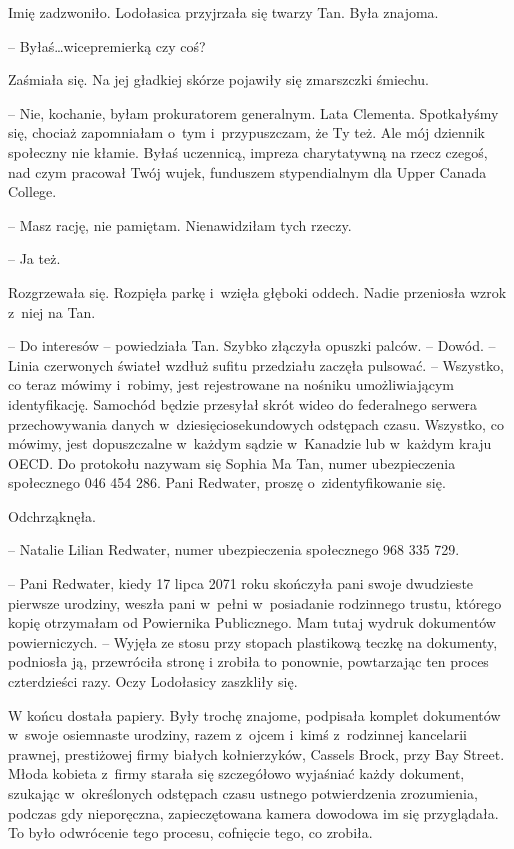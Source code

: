 \documentclass[oneside,polish,11pt,sfheadings]{mwbk}
\begin{document}
Imię zadzwoniło. Lodołasica przyjrzała się twarzy Tan. Była znajoma.

-- Byłaś\ldots  wicepremierką czy coś?

Zaśmiała się. Na jej gładkiej skórze pojawiły się zmarszczki śmiechu. 

-- Nie, kochanie, byłam prokuratorem generalnym. Lata Clementa. Spotkałyśmy
się, chociaż zapomniałam o~tym i~przypuszczam, że Ty też. Ale mój
dziennik społeczny nie kłamie. Byłaś uczennicą, impreza charytatywną na
rzecz czegoś, nad czym pracował Twój wujek, funduszem stypendialnym dla
Upper Canada College.

-- Masz rację, nie pamiętam. Nienawidziłam tych rzeczy.

-- Ja też.

Rozgrzewała się. Rozpięła parkę i~wzięła głęboki oddech. Nadie
przeniosła wzrok z~niej na Tan.

-- Do interesów -- powiedziała Tan. Szybko złączyła opuszki palców. -- Dowód. -- Linia czerwonych świateł wzdłuż sufitu przedziału zaczęła
pulsować. -- Wszystko, co teraz mówimy i~robimy, jest rejestrowane na
nośniku umożliwiającym identyfikację. Samochód będzie przesyłał skrót
wideo do federalnego serwera przechowywania danych w~dziesięciosekundowych odstępach czasu. Wszystko, co mówimy, jest
dopuszczalne w~każdym sądzie w~Kanadzie lub w~każdym kraju OECD. Do
protokołu nazywam się Sophia Ma Tan, numer ubezpieczenia społecznego 046
454 286. Pani Redwater, proszę o~zidentyfikowanie się.

Odchrząknęła. 

-- Natalie Lilian Redwater, numer ubezpieczenia społecznego
968 335 729.

-- Pani Redwater, kiedy 17 lipca 2071 roku skończyła pani swoje
dwudzieste pierwsze urodziny, weszła pani w~pełni w~posiadanie
rodzinnego trustu, którego kopię otrzymałam od Powiernika Publicznego.
Mam tutaj wydruk dokumentów powierniczych. -- Wyjęła ze stosu przy
stopach plastikową teczkę na dokumenty, podniosła ją, przewróciła stronę
i zrobiła to ponownie, powtarzając ten proces czterdzieści razy. Oczy
Lodołasicy zaszkliły się.

W końcu dostała papiery. Były trochę znajome, podpisała komplet
dokumentów w~swoje osiemnaste urodziny, razem z~ojcem i~kimś z~rodzinnej
kancelarii prawnej, prestiżowej firmy białych kołnierzyków, Cassels
Brock, przy Bay Street. Młoda kobieta z~firmy starała się szczegółowo
wyjaśniać każdy dokument, szukając w~określonych odstępach czasu ustnego
potwierdzenia zrozumienia, podczas gdy nieporęczna, zapieczętowana
kamera dowodowa im się przyglądała. To było odwrócenie tego procesu,
cofnięcie tego, co zrobiła.
\end{document}
